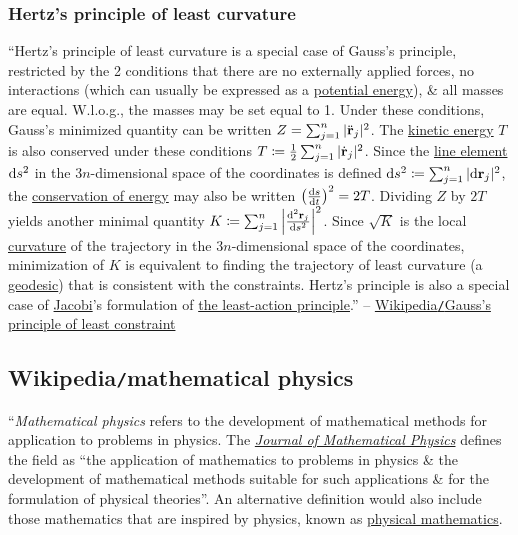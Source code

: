 \documentclass{article}
\begin{document}
\subsubsection{Hertz's principle of least curvature}
``Hertz's principle of least curvature is a special case of Gauss's principle, restricted by the 2 conditions that there are no externally applied forces, no interactions (which can usually be expressed as a \href{https://en.wikipedia.org/wiki/Potential_energy}{potential energy}), \& all masses are equal. W.l.o.g., the masses may be set equal to 1. Under these conditions, Gauss's minimized quantity can be written $Z = \sum_{j=1}^n |\ddot{\bf r}_j|^2$. The \href{https://en.wikipedia.org/wiki/Kinetic_energy}{kinetic energy} $T$ is also conserved under these conditions $T\coloneqq\frac{1}{2}\sum_{j=1}^n |\dot{\bf r}_j|^2$. Since the \href{https://en.wikipedia.org/wiki/Line_element}{line element} ${\rm d}s^2$ in the $3n$-dimensional space of the coordinates is defined ${\rm d}s^2\coloneqq\sum_{j=1}^n |{\rm d}{\bf r}_j|^2$, the \href{https://en.wikipedia.org/wiki/Conservation_of_energy}{conservation of energy} may also be written $\left(\frac{{\rm d}s}{{\rm d}t}\right)^2 = 2T$. Dividing $Z$ by $2T$ yields another minimal quantity $K\coloneqq\sum_{j=1}^n \left|\frac{{\rm d}^2{\bf r}_j}{{\rm d}s^2}\right|^2$. Since $\sqrt{K}$ is the local \href{https://en.wikipedia.org/wiki/Curvature}{curvature} of the trajectory in the $3n$-dimensional space of the coordinates, minimization of $K$ is equivalent to finding the trajectory of least curvature (a \href{https://en.wikipedia.org/wiki/Geodesic}{geodesic}) that is consistent with the constraints. Hertz's principle is also a special case of \href{https://en.wikipedia.org/wiki/Carl_Gustav_Jakob_Jacobi}{Jacobi}'s formulation of \href{https://en.wikipedia.org/wiki/Maupertuis%27_principle}{the least-action principle}.'' -- \href{https://en.wikipedia.org/wiki/Gauss's_principle_of_least_constraint}{Wikipedia{\tt/}Gauss's principle of least constraint}


\subsection{Wikipedia{\tt/}mathematical physics}
``{\it Mathematical physics} refers to the development of mathematical methods for application to problems in physics. The \href{https://en.wikipedia.org/wiki/Journal_of_Mathematical_Physics}{\it Journal of Mathematical Physics} defines the field as ``the application of mathematics to problems in physics \& the development of mathematical methods suitable for such applications \& for the formulation of physical theories''. An alternative definition would also include those mathematics that are inspired by physics, known as \href{https://en.wikipedia.org/wiki/Physical_mathematics}{physical mathematics}.
\end{document}
